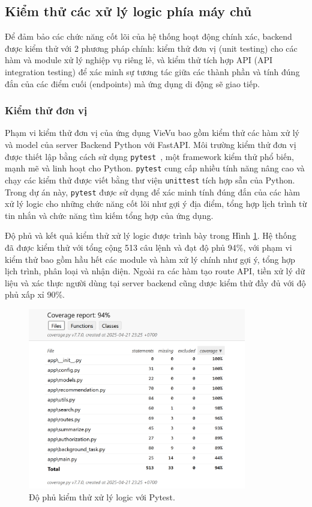 
\subsection{Kiểm thử các xử lý logic phía máy chủ}

Để đảm bảo các chức năng cốt lõi của hệ thống hoạt động chính xác, backend được kiểm thử với 2 phương pháp chính: kiểm thử đơn vị (unit testing) cho các hàm và module xử lý nghiệp vụ riêng lẻ, và kiểm thử tích hợp API (API integration testing) để xác minh sự tương tác giữa các thành phần và tính đúng đắn của các điểm cuối (endpoints) mà ứng dụng di động sẽ giao tiếp.

\subsubsection{Kiểm thử đơn vị}

Phạm vi kiểm thử đơn vị của ứng dụng VieVu bao gồm kiểm thử các hàm xử lý và model của server Backend Python với FastAPI. Môi trường kiểm thử đơn vị được thiết lập bằng cách sử dụng \texttt{pytest}~\cite{pytest}, một framework kiểm thử phổ biến, mạnh mẽ và linh hoạt cho Python. \texttt{pytest} cung cấp nhiều tính năng nâng cao và chạy các kiểm thử được viết bằng thư viện \texttt{unittest} tích hợp sẵn của Python. Trong dự án này, \texttt{pytest} được sử dụng để xác minh tính đúng đắn của các hàm xử lý logic cho những chức năng cốt lõi như gợi ý địa điểm, tổng hợp lịch trình từ tin nhắn và chức năng tìm kiếm tổng hợp của ứng dụng.

Độ phủ và kết quả kiểm thử xử lý logic được trình bày trong Hình \ref{fig:pytest-testing}. Hệ thống đã được kiểm thử với tổng cộng 513 câu lệnh và đạt độ phủ 94\%, với phạm vi kiểm thử bao gồm hầu hết các module và hàm xử lý chính như gợi ý, tổng hợp lịch trình, phân loại và nhận diện. Ngoài ra các hàm tạo route API, tiền xử lý dữ liệu và xác thực người dùng tại server backend cũng dược kiểm thử đầy đủ với độ phủ xấp xỉ 90\%.



\begin{figure}[H]
    \centering  
    \includegraphics[width=0.85\textwidth]{figures/c4/unittest.png}
    \caption{Độ phủ kiểm thử xử lý logic với Pytest.}
    \label{fig:pytest-testing}
\end{figure}



